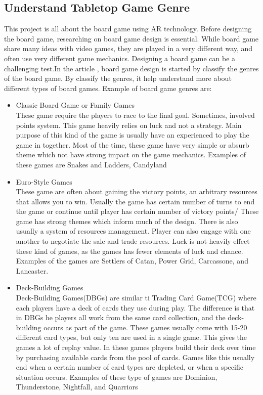 \documentclass[12pt]{article}
\begin{document}
\subsection{Understand Tabletop Game Genre}
This project is all about the board game using AR technology. Before designing the board game, researching on board game design is essential. While board game share many ideas with video games, they are played in a very different way, and often use very different game mechanics. Designing a board game can be a challenging test.In the article , board game design is started by classify the genres of the board game. By classify the genres, it help understand more about different types of board games. Example of board game genres are:

\begin{itemize}

\item Classic Board Game or Family Games
\\ These game require the players to race to the final goal. Sometimes, involved points system. This game heavily relies on luck and not a strategy. Main purpose of this kind of the game is usually have an experienced to play the game in together. Most of the time, these game have very simple or absurb theme which not have strong impact on the game mechanics. Examples of these games are Snakes and Ladders, Candyland
\item Euro-Style Games
\\ These game are often about gaining the victory points, an arbitrary resources that allows you to win. Usually the game has certain number of turns to end the game or continue until player has certain number of victory points/ These game has strong themes which inform much of the design. There is also usually a system of resources management. Player can also engage with one another to negotiate the sale and trade resources. Luck is not heavily effect these kind of games, as the games has fewer elements of luck and chance. Examples of the games are Settlers of Catan, Power Grid, Carcassone, and Lancaster.

\item Deck-Building Games
\\ Deck-Building Games(DBGs) are similar ti Trading Card Game(TCG) where each players have a deck of cards they use during play. The difference is that in DBGs he players all work from the same card collection, and the deck-building occurs as part of the game. These games usually come with 15-20 different card types, but only ten are used in a single game. This gives the games a lot of replay value. In these games players build their deck over time by purchasing available cards from the pool of cards. Games like this usually end when a certain number of card types are depleted, or when a specific situation occurs.
Examples of these type of games are Dominion, Thunderstone, Nightfall, and Quarriors


\end{itemize}
\end{document}
